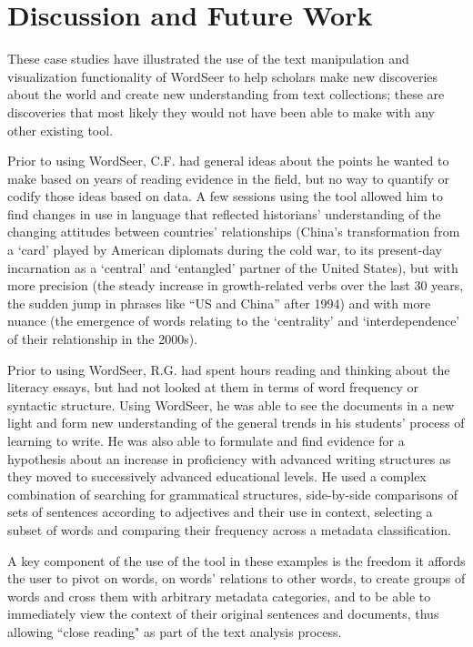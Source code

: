




\section{Discussion and Future Work}

These case studies have illustrated the use of the text manipulation and visualization functionality of WordSeer to help scholars make new discoveries about the world and create new understanding from text collections; these are discoveries that most likely they would not have been able to make with any other existing tool.

Prior to using WordSeer, C.F. had general ideas about the points he wanted to make based on years of reading evidence in the field, but no way to quantify or codify those ideas based on data.  A few sessions using the tool allowed him to find changes in use in language that reflected historians' understanding of the changing attitudes between countries' relationships (China's transformation from a `card' played by American diplomats during the cold war,  to its present-day incarnation as a `central' and `entangled' partner of the United States), but with more precision (the steady increase in growth-related verbs over the last 30 years, the sudden jump in  phrases like ``US and China'' after 1994) and with more nuance (the emergence of words relating to the `centrality' and `interdependence'  of their relationship in the 2000s).


Prior to using WordSeer, R.G. had spent hours reading and thinking about the literacy essays, but had not looked at them in terms of word frequency or syntactic structure.  Using WordSeer, he was able to see the documents in a new light and form new  understanding of the general trends in his students' process of learning to write.   He was also able to formulate and find evidence for a hypothesis about an increase in proficiency with advanced writing structures as they moved to successively advanced educational levels.   He used a complex combination of searching for grammatical structures, side-by-side comparisons of sets of sentences according to adjectives and their use in context, selecting a subset of words and comparing their frequency across a metadata classification.  

A key component of the use of the tool in these examples is the freedom it affords the user to pivot on words, on words' relations to other words, to create groups of words and cross them with arbitrary metadata categories, and to be able to immediately view  the context of their original sentences and documents, thus allowing ``close reading" as part of the text analysis process.

